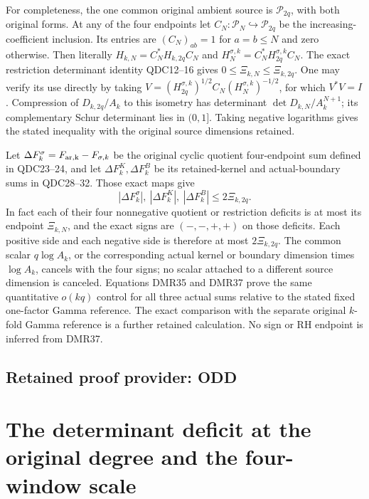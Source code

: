 \documentclass[11pt,a4paper]{article}
\begin{document}
For completeness, the one common original ambient source is
$\mathcal P_{2q}$, with both original forms. At any of the
four endpoints let
$C_N:\mathcal P_N\hookrightarrow\mathcal P_{2q}$
be the increasing-coefficient inclusion. Its entries are
$(C_N)_{ab}=1$ for $a=b\leq N$ and zero otherwise.
Then literally
$H_{k,N}=C_N^*H_{k,2q}C_N$ and
$H_N^{\sigma,k}=C_N^*H_{2q}^{\sigma,k}C_N$.
The exact restriction determinant identity QDC12--16 gives
$0\leq\Xi_{k,N}\leq\Xi_{k,2q}$.
One may verify its use directly by taking
$V=(H_{2q}^{\sigma,k})^{1/2}C_N
       (H_N^{\sigma,k})^{-1/2}$, for which $V^*V=I$.
Compression of $D_{k,2q}/A_k$ to this isometry has determinant
$\det D_{k,N}/A_k^{N+1}$; its complementary Schur determinant
lies in $(0,1]$. Taking negative logarithms gives the stated
inequality with the original source dimensions retained.

Let $\Delta F^\sigma_k=F_{\rm ar,k}-F_{\sigma,k}$ be the
original cyclic quotient four-endpoint sum defined in QDC23--24,
and let $\Delta F^K_k,\Delta F^B_k$ be its retained-kernel
and actual-boundary sums in QDC28--32. Those exact maps give
\[
 \boxed{\quad
 |\Delta F^\sigma_k|,\ |\Delta F^K_k|,\ |\Delta F^B_k|
      \leq2\Xi_{k,2q}.
 \quad}\tag{DMR37}
\]
In fact each of their four nonnegative quotient or restriction
deficits is at most its endpoint $\Xi_{k,N}$, and the exact
signs are $(-,-,+,+)$ on those deficits. Each positive side
and each negative side is therefore at most $2\Xi_{k,2q}$.
The common scalar $q\log A_k$, or the corresponding actual
kernel or boundary dimension times $\log A_k$, cancels with
the four signs; no scalar attached to a different source
dimension is canceled. Equations DMR35 and DMR37 prove the
same quantitative $o(kq)$ control for all three actual sums
relative to the stated fixed one-factor Gamma reference.
The exact comparison with the separate original $k$-fold
Gamma reference is a further retained calculation. No sign
or RH endpoint is inferred from DMR37.


\clearpage
\subsection*{Retained proof provider: ODD}

\section{The determinant deficit at the original degree and the four-window scale}
\label{sec:original-degree-deficit}
\end{document}
